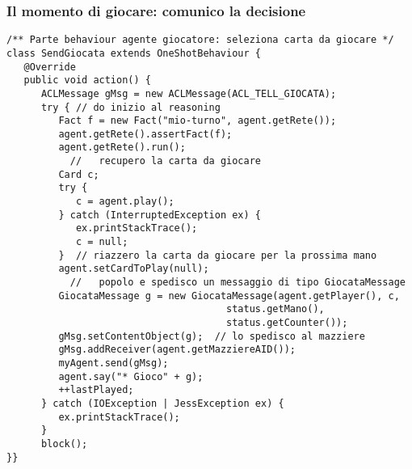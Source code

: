 \documentclass{beamer}
\begin{document}
\begin{frame}[fragile]
   \frametitle{Il momento di giocare: comunico la decisione}
%    
   
\begin{lstlisting}
/** Parte behaviour agente giocatore: seleziona carta da giocare */
class SendGiocata extends OneShotBehaviour {
   @Override
   public void action() {
      ACLMessage gMsg = new ACLMessage(ACL_TELL_GIOCATA);
      try {	// do inizio al reasoning
         Fact f = new Fact("mio-turno", agent.getRete());
         agent.getRete().assertFact(f);
         agent.getRete().run();
		   //	recupero la carta da giocare
         Card c;
         try {
            c = agent.play();
         } catch (InterruptedException ex) {
            ex.printStackTrace();
            c = null;
         }	// riazzero la carta da giocare per la prossima mano
         agent.setCardToPlay(null);
		   //	popolo e spedisco un messaggio di tipo GiocataMessage
         GiocataMessage g = new GiocataMessage(agent.getPlayer(), c,
                                      status.getMano(),
                                      status.getCounter());
         gMsg.setContentObject(g);	// lo spedisco al mazziere
         gMsg.addReceiver(agent.getMazziereAID());
         myAgent.send(gMsg);
         agent.say("* Gioco" + g);
         ++lastPlayed;
      } catch (IOException | JessException ex) {
         ex.printStackTrace();
      }
      block();
}}
\end{lstlisting}

\end{frame}
\end{document}
